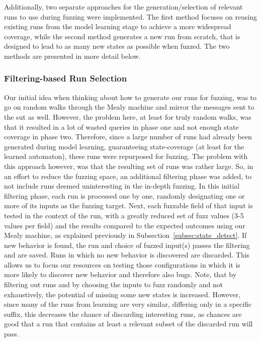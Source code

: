 Additionally, two separate approaches for the generation/selection of relevant runs to use during fuzzing were implemented. The first method focuses on reusing existing runs from the model learning stage to achieve a more widespread coverage, while the second method generates a new run from scratch, that is designed to lead to as many new states as possible when fuzzed. The two methods are presented in more detail below.

\subsubsection{Filtering-based Run Selection} \label{subsubsec:fuzz_filtering}
Our initial idea when thinking about how to generate our runs for fuzzing, was to go on random walks through the Mealy machine and mirror the messages sent to the \ac{sut} as well. However, the problem here, at least for truly random walks, was that it resulted in a lot of wasted queries in phase one and not enough state coverage in phase two. Therefore, since a large number of runs had already been generated during model learning, guaranteeing state-coverage (at least for the learned automaton), these runs were repurposed for fuzzing. The problem with this approach however, was that the resulting set of runs was rather large. So, in an effort to reduce the fuzzing space, an additional filtering phase was added, to not include runs deemed uninteresting in the in-depth fuzzing. In this initial filtering phase, each run is processed one by one, randomly designating one or more of its inputs as the fuzzing target. Next, each fuzzable field of that input is tested in the context of the run, with a greatly reduced set of fuzz values (3-5 values per field) and the results compared to the expected outcomes using our Mealy machine, as explained previously in Subsection~\ref{subsec:state_detect}. If new behavior is found, the run and choice of fuzzed input(s) passes the filtering and are saved. Runs in which no new behavior is discovered are discarded. This allows us to focus our resources on testing those configurations in which it is more likely to discover new behavior and therefore also bugs.
Note, that by filtering out runs and by choosing the inputs to fuzz randomly and not exhaustively, the potential of missing some new states is increased. However, since many of the runs from learning are very similar, differing only in a specific suffix, this decreases the chance of discarding interesting runs, as chances are good that a run that contains at least a relevant subset of the discarded run will pass.

